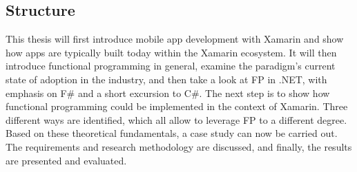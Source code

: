 \subsection{Structure}

This thesis will first introduce mobile app development with Xamarin and show how apps are typically built today within the Xamarin ecosystem. It will then introduce functional programming in general, examine the paradigm's current state of adoption in the industry, and then take a look at FP in .NET, with emphasis on F\# and a short excursion to C\#.  The next step is to show how functional programming could be implemented in the context of Xamarin. Three different ways are identified, which all allow to leverage FP to a different degree. Based on these theoretical fundamentals, a case study can now be carried out. The requirements and research methodology are discussed, and finally, the results are presented and evaluated.
